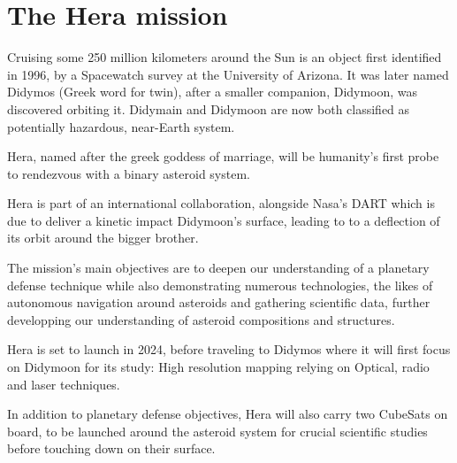 \section{The Hera mission}
\label{intro}

Cruising some 250 million kilometers around the Sun is an object first identified in 1996, by a Spacewatch survey at the  University of Arizona. It was later named Didymos (Greek word for twin), after a smaller companion, Didymoon, was discovered orbiting it. Didymain and Didymoon are now both classified  as potentially hazardous, near-Earth system. 

Hera, named after the greek goddess of marriage, will be humanity's first probe to rendezvous with a binary asteroid system. 

Hera is part of an international collaboration, alongside Nasa's DART which is due to deliver a kinetic impact Didymoon's surface, leading to to a deflection of its orbit around the bigger brother.  

The mission's main objectives are to deepen our understanding of a planetary defense technique while also demonstrating numerous technologies, the likes of autonomous navigation around asteroids and gathering scientific data, further developping our understanding of asteroid compositions and structures. 


Hera is set to launch in 2024, before traveling to Didymos where it will first focus on Didymoon for its study: High resolution mapping relying on Optical, radio and laser techniques. 


In addition to planetary defense objectives, Hera will also carry two CubeSats on board, to be launched around the asteroid system for crucial scientific studies before touching down on their surface.

